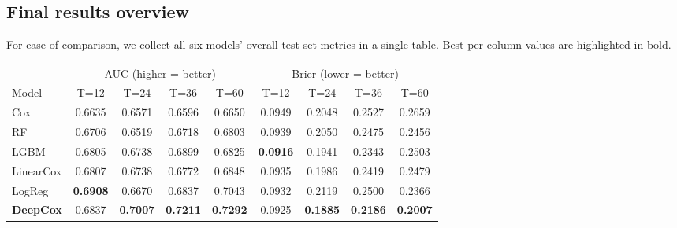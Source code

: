 \documentclass[11pt,a4paper]{article}
\begin{document}
\subsection{Final results overview}

For ease of comparison, we collect all six models' overall test-set metrics in a single table. Best per-column values are highlighted in bold.

\begin{center}
  \small
  \begin{tabular}{lcccc|cccc}
    \toprule
                     & \multicolumn{4}{c|}{AUC (higher = better)} & \multicolumn{4}{c}{Brier (lower = better)}                                                                                                             \\
    Model            & T=12                                       & T=24                                       & T=36            & T=60            & T=12            & T=24            & T=36            & T=60            \\
    \midrule
    Cox              & 0.6635                                     & 0.6571                                     & 0.6596          & 0.6650          & 0.0949          & 0.2048          & 0.2527          & 0.2659          \\
    RF               & 0.6706                                     & 0.6519                                     & 0.6718          & 0.6803          & 0.0939          & 0.2050          & 0.2475          & 0.2456          \\
    LGBM             & 0.6805                                     & 0.6738                                     & 0.6899          & 0.6825          & \textbf{0.0916} & 0.1941          & 0.2343          & 0.2503          \\
    LinearCox        & 0.6807                                     & 0.6738                                     & 0.6772          & 0.6848          & 0.0935          & 0.1986          & 0.2419          & 0.2479          \\
    LogReg           & \textbf{0.6908}                            & 0.6670                                     & 0.6837          & 0.7043          & 0.0932          & 0.2119          & 0.2500          & 0.2366          \\
    \textbf{DeepCox} & 0.6837                                     & \textbf{0.7007}                            & \textbf{0.7211} & \textbf{0.7292} & 0.0925          & \textbf{0.1885} & \textbf{0.2186} & \textbf{0.2007} \\
    \bottomrule
  \end{tabular}
\end{center}
\end{document}
